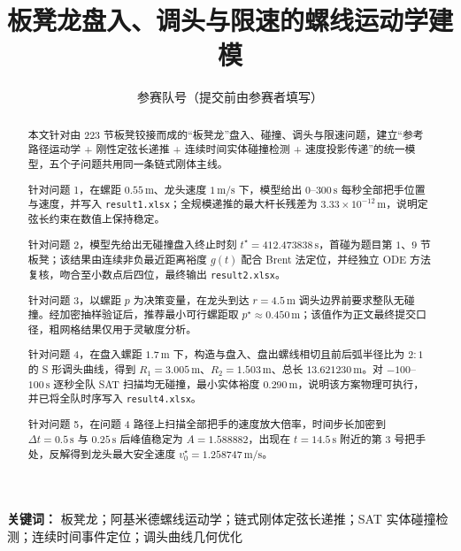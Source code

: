 \documentclass[a4paper, 12pt]{ctexart}
\title{板凳龙盘入、调头与限速的螺线运动学建模}
\author{参赛队号（提交前由参赛者填写）}
\date{}
\begin{document}
\maketitle

\begin{abstract}
本文针对由 223 节板凳铰接而成的“板凳龙”盘入、碰撞、调头与限速问题，建立“参考路径运动学 + 刚性定弦长递推 + 连续时间实体碰撞检测 + 速度投影传递”的统一模型，五个子问题共用同一条链式刚体主线。

针对问题 1，在螺距 $0.55\,\mathrm{m}$、龙头速度 $1\,\mathrm{m/s}$ 下，模型给出 $0$--$300\,\mathrm{s}$ 每秒全部把手位置与速度，并写入 \texttt{result1.xlsx}；全规模递推的最大杆长残差为 $3.33\times10^{-12}\,\mathrm{m}$，说明定弦长约束在数值上保持稳定。

针对问题 2，模型先给出无碰撞盘入终止时刻 $t^\star=412.473838\,\mathrm{s}$，首碰为题目第 $1$、$9$ 节板凳；该结果由连续非负最近距离裕度 $g(t)$ 配合 Brent 法定位，并经独立 ODE 方法复核，吻合至小数点后四位，最终输出 \texttt{result2.xlsx}。

针对问题 3，以螺距 $p$ 为决策变量，在龙头到达 $r=4.5\,\mathrm{m}$ 调头边界前要求整队无碰撞。经加密抽样验证后，推荐最小可行螺距取 $p^\star\approx0.450\,\mathrm{m}$；该值作为正文最终提交口径，粗网格结果仅用于灵敏度分析。

针对问题 4，在盘入螺距 $1.7\,\mathrm{m}$ 下，构造与盘入、盘出螺线相切且前后弧半径比为 $2{:}1$ 的 S 形调头曲线，得到 $R_1=3.005\,\mathrm{m}$、$R_2=1.503\,\mathrm{m}$、总长 $13.621230\,\mathrm{m}$。对 $-100$--$100\,\mathrm{s}$ 逐秒全队 SAT 扫描均无碰撞，最小实体裕度 $0.290\,\mathrm{m}$，说明该方案物理可执行，并已将全队时序写入 \texttt{result4.xlsx}。

针对问题 5，在问题 4 路径上扫描全部把手的速度放大倍率，时间步长加密到 $\Delta t=0.5\,\mathrm{s}$ 与 $0.25\,\mathrm{s}$ 后峰值稳定为 $A=1.588882$，出现在 $t=14.5\,\mathrm{s}$ 附近的第 $3$ 号把手处，反解得到龙头最大安全速度 $v_0^\star=1.258747\,\mathrm{m/s}$。
\end{abstract}

\noindent\textbf{关键词：} 板凳龙；阿基米德螺线运动学；链式刚体定弦长递推；SAT 实体碰撞检测；连续时间事件定位；调头曲线几何优化

\newpage

\end{document}
